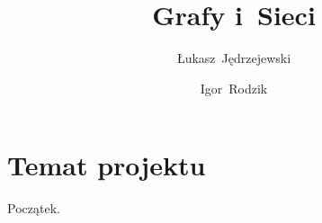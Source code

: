 \documentclass[a4paper,12pt]{mwart}
\title{
	Grafy i~Sieci
}
\author{
	Łukasz~Jędrzejewski
    \and
	Igor~Rodzik
}
\date{}
\begin{document}
\maketitle

\section{Temat projektu}

Początek.
\end{document}
